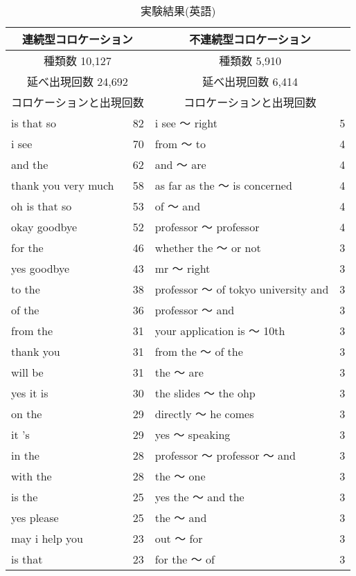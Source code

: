 \begin{table}[hbt]
\begin{center}
\caption{実験結果(英語)}
\label{Tab:ecolalphaht209}
\begin{footnotesize}
\begin{tabular}{|lr||lr|}
\hline
\multicolumn{2}{|c||}{連続型コロケーション} & \multicolumn{2}{c|}{不連続型コロケーション}\\
\hline
\multicolumn{2}{|c||}{種類数 10,127} & \multicolumn{2}{c|}{種類数 5,910}\\
\hline
\multicolumn{2}{|c||}{延べ出現回数 24,692} & \multicolumn{2}{c|}{延べ出現回数 6,414}\\
\hline
\multicolumn{2}{|c||}{コロケーションと出現回数} & \multicolumn{2}{c|}{コロケーションと出現回数}\\
\hline
is that so & 82 & i see 〜 right & 5\\
i see & 70 & from 〜 to & 4\\
and the & 62 & and 〜 are & 4\\
thank you very much & 58 & as far as the 〜 is concerned & 4\\
oh is that so & 53 & of 〜 and & 4\\
okay goodbye & 52 & professor 〜 professor & 4\\
for the & 46 & whether the 〜 or not & 3\\
yes goodbye & 43 & mr 〜 right & 3\\
to the & 38 & professor 〜 of tokyo university and & 3\\
of the & 36 & professor 〜 and & 3\\
from the & 31 & your application is 〜 10th & 3\\
thank you & 31 & from the 〜 of the & 3\\
will be & 31 & the 〜 are & 3\\
yes it is & 30 & the slides 〜 the ohp & 3\\
on the & 29 & directly 〜 he comes & 3\\
it 's & 29 & yes 〜 speaking & 3\\
in the & 28 & professor 〜 professor 〜 and & 3\\
with the & 28 & the 〜 one & 3\\
is the & 25 & yes the 〜 and the & 3\\
yes please & 25 & the 〜 and & 3\\
may i help you & 23 & out 〜 for & 3\\
is that & 23 & for the 〜 of & 3\\

\end{tabular}
\end{footnotesize}
\end{center}
\end{table}
